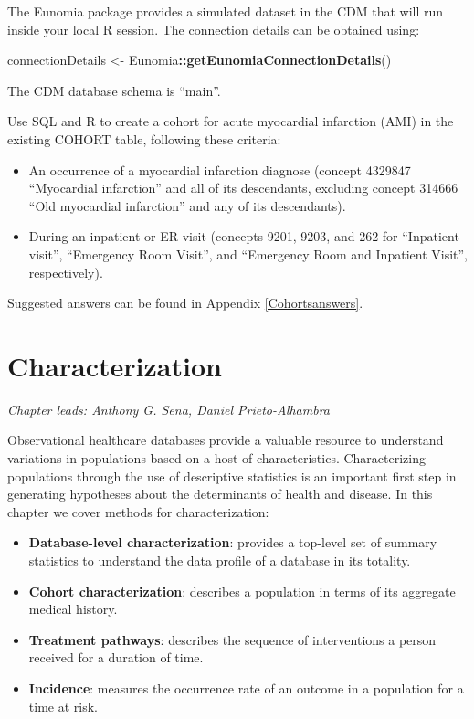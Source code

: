 \documentclass[11pt]{book}
\newenvironment{Shaded}{\begin{snugshade}}{\end{snugshade}}
\newcommand{\KeywordTok}[1]{\textcolor[rgb]{0.13,0.29,0.53}{\textbf{#1}}}
\newcommand{\NormalTok}[1]{#1}
\newcommand{\OperatorTok}[1]{\textcolor[rgb]{0.81,0.36,0.00}{\textbf{#1}}}
\newcommand{\StringTok}[1]{\textcolor[rgb]{0.31,0.60,0.02}{#1}}
\providecommand{\tightlist}{%
  \setlength{\itemsep}{0pt}\setlength{\parskip}{0pt}}
\theoremstyle{definition}
\theoremstyle{definition}
\theoremstyle{definition}
\theoremstyle{remark}
\let\BeginKnitrBlock\begin \let\EndKnitrBlock\end
\begin{document}
The Eunomia package provides a simulated dataset in the CDM that will run inside your local R session. The connection details can be obtained using:

\begin{Shaded}
\begin{Highlighting}[]
\NormalTok{connectionDetails <-}\StringTok{ }\NormalTok{Eunomia}\OperatorTok{::}\KeywordTok{getEunomiaConnectionDetails}\NormalTok{()}
\end{Highlighting}
\end{Shaded}

The CDM database schema is ``main''.

\BeginKnitrBlock{exercise}
\protect\hypertarget{exr:exerciseCohortsSql}{}{\label{exr:exerciseCohortsSql} }Use SQL and R to create a cohort for acute myocardial infarction (AMI) in the existing COHORT table, following these criteria:

\begin{itemize}
\tightlist
\item
  An occurrence of a myocardial infarction diagnose (concept 4329847 ``Myocardial infarction'' and all of its descendants, excluding concept 314666 ``Old myocardial infarction'' and any of its descendants).
\item
  During an inpatient or ER visit (concepts 9201, 9203, and 262 for ``Inpatient visit'', ``Emergency Room Visit'', and ``Emergency Room and Inpatient Visit'', respectively).
\end{itemize}
\EndKnitrBlock{exercise}

Suggested answers can be found in Appendix \ref{Cohortsanswers}.

\hypertarget{Characterization}{%
\chapter{Characterization}\label{Characterization}}

\emph{Chapter leads: Anthony G. Sena, Daniel Prieto-Alhambra}

Observational healthcare databases provide a valuable resource to understand variations in populations based on a host of characteristics. Characterizing populations through the use of descriptive statistics is an important first step in generating hypotheses about the determinants of health and disease. In this chapter we cover methods for characterization:

\begin{itemize}
\tightlist
\item
  \textbf{Database-level characterization}: provides a top-level set of summary statistics to understand the data profile of a database in its totality.
\item
  \textbf{Cohort characterization}: describes a population in terms of its aggregate medical history.
\item
  \textbf{Treatment pathways}: describes the sequence of interventions a person received for a duration of time.
\item
  \textbf{Incidence}: measures the occurrence rate of an outcome in a population for a time at risk.
\end{itemize}
\end{document}
